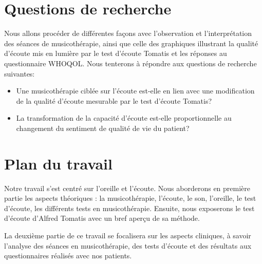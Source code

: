 \section*{Questions de recherche}

Nous allons procéder de différentes façons avec l'observation et l'interprétation  des séances de 
musicothérapie, ainsi que celle des graphiques illustrant la qualité d'écoute mis en lumière par le test 
d'écoute Tomatis 
et les réponses au 
questionnaire WHOQOL. 
Nous tenterons à 
répondre aux questions de recherche suivantes: 

\begin{itemize}
\item Une musicothérapie ciblée sur l'écoute  est-elle en lien avec une modification de la qualité d'écoute 
mesurable par le test d'écoute Tomatis?
        
  \item La transformation de la capacité d'écoute est-elle  proportionnelle au changement 
  du sentiment de qualité de vie du patient?
   \end{itemize}




\section*{Plan du travail}
Notre travail s'est centré sur l'oreille et l'écoute.
Nous aborderons en première partie les aspects théoriques : la musicothérapie, l'écoute, le son, l'oreille, 
le
test d'écoute, les différents tests en musicothérapie. Ensuite, nous
exposerons le test d'écoute d'Alfred Tomatis avec un bref aperçu de sa méthode.

La deuxième partie de ce travail se focalisera sur les aspects
cliniques, à savoir l'analyse des séances en  musicothérapie,  des tests d'écoute et des résultats aux 
questionnaires  réalisés  avec  nos patients.

